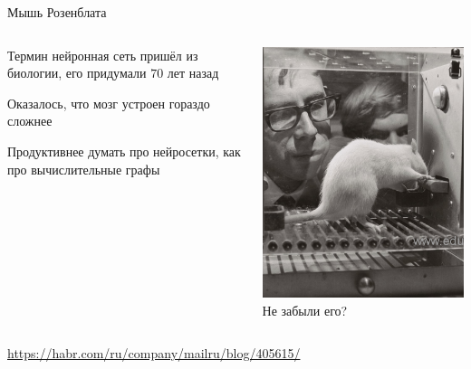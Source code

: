 \documentclass[notes,12pt, aspectratio=169]{beamer}
\newenvironment{wideitemize}{\itemize\addtolength{\itemsep}{10pt}}{\enditemize}
\begin{document}
\begin{frame}{Мышь Розенблата}
\begin{columns}[T] 
\begin{column}{.49\textwidth}
	\begin{wideitemize}
		\item Термин нейронная сеть пришёл из биологии, его придумали $70$ лет назад
		\item  Оказалось, что мозг устроен гораздо сложнее
		\item  Продуктивнее думать про нейросетки,  как про вычислительные графы
	\end{wideitemize}
\end{column}
\begin{column}{.49\textwidth}
	\begin{center}
		\includegraphics[scale=0.35]{rozen_mouse.png}  \\ 
		\Large \alert{Не забыли его?} 
	\end{center}
\end{column}
\end{columns}
\vfill %
\footnotesize 
\color{blue} \url{https://habr.com/ru/company/mailru/blog/405615/}
\end{frame}
\end{document}
